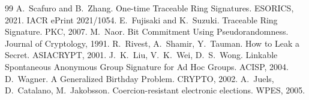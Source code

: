 \documentclass[11pt,a4paper]{article}
\theoremstyle{definition}
\begin{document}
\begin{thebibliography}{99}\small
{} A.~Scafuro and B.~Zhang. One-time Traceable Ring Signatures. ESORICS, 2021. IACR ePrint 2021/1054.
 E.~Fujisaki and K.~Suzuki. Traceable Ring Signature. PKC, 2007.
 M.~Naor. Bit Commitment Using Pseudorandomness. Journal of Cryptology, 1991.
 R.~Rivest, A.~Shamir, Y.~Tauman. How to Leak a Secret. ASIACRYPT, 2001.
 J.~K.~Liu, V.~K.~Wei, D.~S.~Wong. Linkable Spontaneous Anonymous Group Signature for Ad Hoc Groups. ACISP, 2004.
 D.~Wagner. A Generalized Birthday Problem. CRYPTO, 2002.
 A.~Juels, D.~Catalano, M.~Jakobsson. Coercion-resistant electronic elections. WPES, 2005.
\end{thebibliography}
\end{document}

